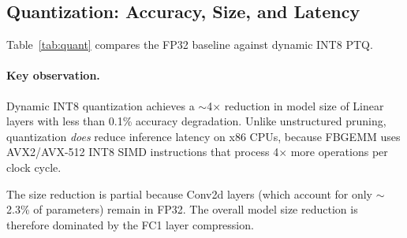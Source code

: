 \subsection{Quantization: Accuracy, Size, and Latency}
\label{sec:quant_results}

Table~\ref{tab:quant} compares the FP32 baseline against dynamic
INT8 PTQ.

\begin{table}[ht]
\centering
\caption{Quantization results. Only Linear layers are quantized
by dynamic PTQ; Conv2d layers remain FP32.}
\label{tab:quant}
\small
{}
\end{table}

\paragraph{Key observation.}
Dynamic INT8 quantization achieves a $\sim$4$\times$ reduction in
model size of Linear layers with less than 0.1\% accuracy degradation.
Unlike unstructured pruning, quantization \emph{does} reduce inference
latency on x86 CPUs, because FBGEMM uses AVX2/AVX-512 INT8 SIMD
instructions that process 4$\times$ more operations per clock cycle.

The size reduction is partial because Conv2d layers (which account for
only $\sim$2.3\% of parameters) remain in FP32.
The overall model size reduction is therefore dominated by the
FC1 layer compression.
